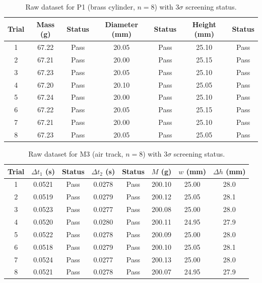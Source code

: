 \begin{table}[H]
\centering
\singlespacing
\caption{Raw dataset for P1 (brass cylinder, $n=8$) with $3\sigma$ screening status.}
\label{tab:p1}
\small
\begin{tabular}{c S[table-format=2.2] c S[table-format=2.2] c S[table-format=2.2] c}
\toprule
\textbf{Trial} & {\textbf{Mass (g)}} & \textbf{Status} & {\textbf{Diameter (mm)}} & \textbf{Status} & {\textbf{Height (mm)}} & \textbf{Status} \\
 & 67.22 & Pass & 20.05 & Pass & 25.10 & Pass \\
2 & 67.21 & Pass & 20.00 & Pass & 25.15 & Pass \\
3 & 67.23 & Pass & 20.05 & Pass & 25.10 & Pass \\
4 & 67.20 & Pass & 20.10 & Pass & 25.05 & Pass \\
5 & 67.24 & Pass & 20.00 & Pass & 25.10 & Pass \\
6 & 67.22 & Pass & 20.05 & Pass & 25.15 & Pass \\
7 & 67.21 & Pass & 20.00 & Pass & 25.10 & Pass \\
8 & 67.23 & Pass & 20.05 & Pass & 25.05 & Pass \\
\bottomrule
\end{tabular}
\end{table}

\begin{table}[H]
\centering
\singlespacing
\caption{Raw dataset for M3 (air track, $n=8$) with $3\sigma$ screening status.}
\label{tab:m3}
\small
\begin{tabular}{c S[table-format=1.4] c S[table-format=1.4] c S[table-format=3.2] S[table-format=2.2] S[table-format=2.1]}
\toprule
\textbf{Trial} & {$\Delta t_1$ (s)} & \textbf{Status} & {$\Delta t_2$ (s)} & \textbf{Status} & {$M$ (g)} & {$w$ (mm)} & {$\Delta h$ (mm)} \\
 & 0.0521 & Pass & 0.0278 & Pass & 200.10 & 25.00 & 28.0 \\
2 & 0.0519 & Pass & 0.0279 & Pass & 200.12 & 25.05 & 28.1 \\
3 & 0.0523 & Pass & 0.0277 & Pass & 200.08 & 25.00 & 28.0 \\
4 & 0.0520 & Pass & 0.0280 & Pass & 200.11 & 24.95 & 27.9 \\
5 & 0.0522 & Pass & 0.0278 & Pass & 200.09 & 25.00 & 28.0 \\
6 & 0.0518 & Pass & 0.0279 & Pass & 200.10 & 25.05 & 28.1 \\
7 & 0.0524 & Pass & 0.0277 & Pass & 200.13 & 25.00 & 28.0 \\
8 & 0.0521 & Pass & 0.0278 & Pass & 200.07 & 24.95 & 27.9 \\
\bottomrule
\end{tabular}
\end{table}
